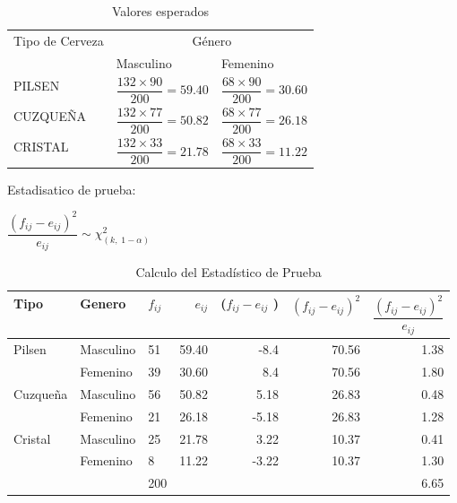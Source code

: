 \documentclass{article}
\begin{document}
\begin{table}[h]
\center
\begin{tabular}{|l|l|l|}
\hline
\multirow{2}{*}{Tipo de Cerveza} & \multicolumn{2}{c|}{Género} \\ \cline{2-3} 
                                 & Masculino     & Femenino    \\ \hline \hline
PILSEN                           & $\dfrac{132 \times 90}{200} = 59.40$ & $\dfrac{68 \times 90}{200} = 30.60$       \\ [1ex] \hline
CUZQUEÑA                         & $\dfrac{132 \times 77}{200} = 50.82$ & $\dfrac{68 \times 77}{200} = 26.18$       \\ [1ex] \hline
CRISTAL                          & $\dfrac{132 \times 33}{200} = 21.78$ & $\dfrac{68 \times 33}{200} = 11.22$       \\ [1ex] \hline
\end{tabular}
\caption{Valores esperados}
\end{table}


Estadisatico de prueba: 

$ \dfrac{(f_{ij}-e_{ij})^2}{e_{ij}} \sim \chi^2_{(k,\; 1-\alpha)}$

\newpage

\begin{table}[h!]
\centering
\begin{tabular}{ll|l|rrr|r|}
\hline
\multicolumn{1}{|l|}{Tipo} & Genero & $f_{ij}$ & \multicolumn{1}{r|}{$e_{ij}$} & \multicolumn{1}{r|}{($f_{ij} - e_{ij}$ )} & $ (f_{ij} - e_{ij})^2 $ & $\dfrac{(f_{ij}-e_{ij})^2}{e_{ij}}$ \\ [1ex] \hline \hline
\multicolumn{1}{|l|}{\multirow{2}{*}{Pilsen}}   & Masculino & 51  & \multicolumn{1}{r|}{59.40} & \multicolumn{1}{r|}{-8.4}  & 70.56 & 1.38 \\ \cline{2-7}
\multicolumn{1}{|l|}{}                          & Femenino  & 39  & \multicolumn{1}{r|}{30.60} & \multicolumn{1}{r|}{8.4}   & 70.56 & 1.80 \\ \hline
\multicolumn{1}{|l|}{\multirow{2}{*}{Cuzqueña}} & Masculino & 56  & \multicolumn{1}{r|}{50.82} & \multicolumn{1}{r|}{5.18}  & 26.83 & 0.48 \\ \cline{2-7}
\multicolumn{1}{|l|}{}                          & Femenino  & 21  & \multicolumn{1}{r|}{26.18} & \multicolumn{1}{r|}{-5.18} & 26.83 & 1.28 \\ \hline
\multicolumn{1}{|l|}{\multirow{2}{*}{Cristal}}  & Masculino & 25  & \multicolumn{1}{r|}{21.78} & \multicolumn{1}{r|}{3.22}  & 10.37 & 0.41 \\ \cline{2-7}
\multicolumn{1}{|l|}{}                          & Femenino  & 8   & \multicolumn{1}{r|}{11.22} & \multicolumn{1}{r|}{-3.22} & 10.37 & 1.30 \\ \hline
                                                &           & 200 &                            &                            &       & 6.65 \\ \cline{3-3} \cline{7-7}
\end{tabular}
\caption{Calculo del Estadístico de Prueba}
\end{table}
\end{document}
